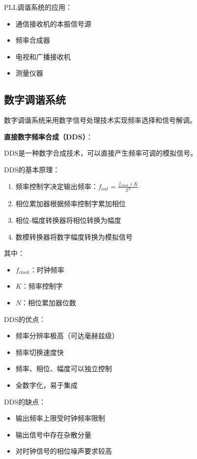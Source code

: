 PLL调谐系统的应用：
\begin{itemize}
    \item 通信接收机的本振信号源
    \item 频率合成器
    \item 电视和广播接收机
    \item 测量仪器
\end{itemize}

\subsection{数字调谐系统}
\label{sec:digital_tuning_system}

数字调谐系统采用数字信号处理技术实现频率选择和信号解调。

\textbf{直接数字频率合成（DDS）}：

DDS是一种数字合成技术，可以直接产生频率可调的模拟信号。

DDS的基本原理：
\begin{enumerate}
    \item 频率控制字决定输出频率：$f_{out} = \frac{f_{clock} \times K}{2^N}$
    \item 相位累加器根据频率控制字累加相位
    \item 相位-幅度转换器将相位转换为幅度
    \item 数模转换器将数字幅度转换为模拟信号
\end{enumerate}

其中：
\begin{itemize}
    \item $f_{clock}$：时钟频率
    \item $K$：频率控制字
    \item $N$：相位累加器位数
\end{itemize}

DDS的优点：
\begin{itemize}
    \item 频率分辨率极高（可达毫赫兹级）
    \item 频率切换速度快
    \item 频率、相位、幅度可以独立控制
    \item 全数字化，易于集成
\end{itemize}

DDS的缺点：
\begin{itemize}
    \item 输出频率上限受时钟频率限制
    \item 输出信号中存在杂散分量
    \item 对时钟信号的相位噪声要求较高
\end{itemize}

